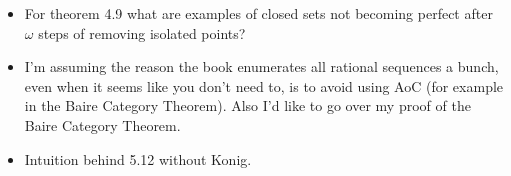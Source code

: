 \documentclass{article}
\theoremstyle{definition}
\newcommand{\Q}{\mathbb{Q}}
\newcommand{\R}{\mathbb{R}}
\begin{document}
\begin{itemize}
    \item For theorem 4.9 what are examples of closed sets not becoming perfect after $\omega$ steps of removing isolated points?
    \item I'm assuming the reason the book enumerates all rational sequences a bunch, even when it seems like you don't need to, is to avoid using AoC (for example in the Baire Category Theorem). Also I'd like to go over my proof of the Baire Category Theorem.
    \item Intuition behind 5.12 without Konig.
\end{itemize}
\end{document}
